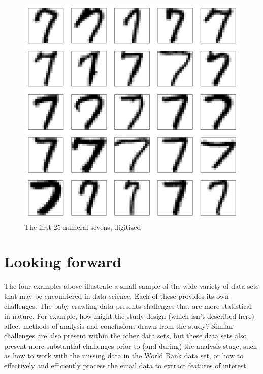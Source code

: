 \documentclass[12pt,oneside]{book}\usepackage[]{graphicx}\usepackage[]{color}
\makeatletter
\def\maxwidth{ %
  \ifdim\Gin@nat@width>\linewidth
    \linewidth
  \else
    \Gin@nat@width
  \fi
}
\newenvironment{knitrout}{}{} %
\makeatother
\begin{document}
\begin{figure}[htbp]
\begin{knitrout}
\color{fgcolor}
\includegraphics[width=\maxwidth]{figure/unnamed-chunk-15-1} 

\end{knitrout}
\caption{The first 25 numeral sevens, digitized}
\label{FIG:25SEVENS}
\end{figure}

\section{Looking forward}
The four examples above illustrate a small sample of the wide variety of data sets that may be encountered in data science. Each of these provides its own challenges. The baby crawling data presents challenges that are more statistical in nature. For example, how might the study design (which isn't described here) affect methods of analysis and conclusions drawn from the study? Similar challenges are also present within the other data sets, but these data sets also present more substantial challenges prior to (and during) the analysis stage, such as how to work with the missing data in the World Bank data set, or how to effectively and efficiently process the email data to extract features of interest.
\end{document}
